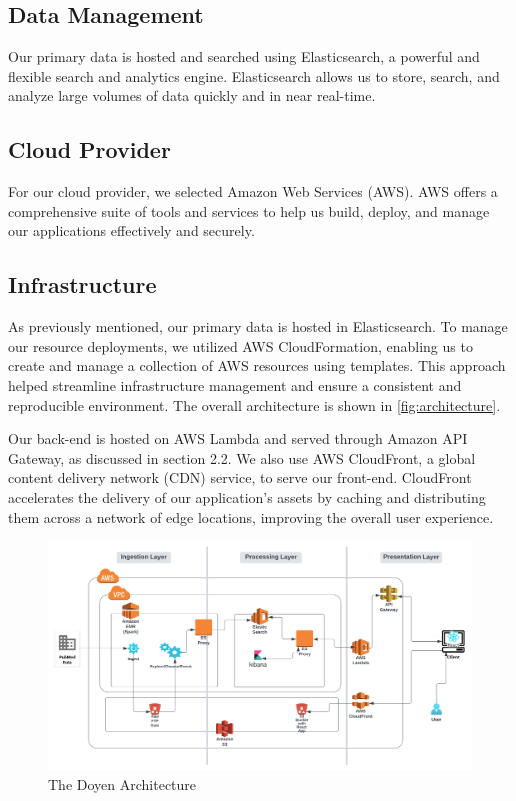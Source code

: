\subsection{Data Management}

Our primary data is hosted and searched using Elasticsearch, a powerful and flexible search and analytics engine. Elasticsearch allows us to store, search, and analyze large volumes of data quickly and in near real-time.

\subsection{Cloud Provider}

For our cloud provider, we selected Amazon Web Services (AWS). AWS offers a comprehensive suite of tools and services to help us build, deploy, and manage our applications effectively and securely. 

\subsection{Infrastructure}

As previously mentioned, our primary data is hosted in Elasticsearch. To manage our resource deployments, we utilized AWS CloudFormation, enabling us to create and manage a collection of AWS resources using templates. This approach helped streamline infrastructure management and ensure a consistent and reproducible environment. The overall architecture is shown in \autoref{fig:architecture}.

Our back-end is hosted on AWS Lambda and served through Amazon API Gateway, as discussed in section 2.2. We also use AWS CloudFront, a global content delivery network (CDN) service, to serve our front-end. CloudFront accelerates the delivery of our application's assets by caching and distributing them across a network of edge locations, improving the overall user experience. 

\begin{figure}[htp]
    \centering
    \includegraphics[width=\textwidth]{Images/Doyen High-Level Architecture Diagram.png}
    \caption{The Doyen Architecture}
    \label{fig:architecture}
\end{figure}

